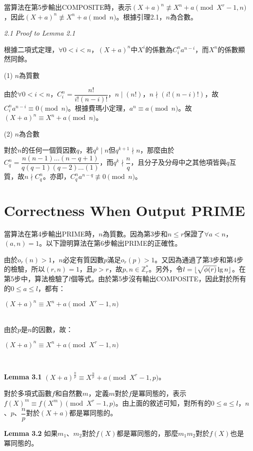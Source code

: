 \documentclass{article}
\DeclarePairedDelimiter\floor{\lfloor}{\rfloor}
\newcommand{\nequiv}{\not\equiv}
\begin{document}
    當算法在第5步輸出COMPOSITE時，表示$(X+a)^n\nequiv X^n+a \pmod{X^r-1, n}$，因此$(X+a)^n\nequiv X^n+a \pmod{n}$。根據引理2.1，$n$為合數。

\noindent\textit{2.1 Proof to Lemma 2.1} 

    根據二項式定理，$\forall 0<i<n$，$(X+a)^n$中$X^i$的係數為$C^n_ia^{n-i}$，而$X^n$的係數顯然同餘。

    \noindent (1) $n$為質數
    
        由於$\forall 0<i<n$，$C^n_i=\dfrac{n!}{i!(n-i)!}$，$n\mid(n!)$，$n\nmid(i!(n-i)!)$，故$C^n_ia^{n-i}\equiv 0\pmod{n}$。根據費瑪小定理，$a^n\equiv a\pmod{n}$。故$(X+a)^n\equiv X^n+a \pmod{n}$。

    \noindent (2) $n$為合數

        對於$n$的任何一個質因數$q$，若$q^k\mid n$但$q^{k+1}\nmid n$，那麼由於$C^n_q=\dfrac{n(n-1)...(n-q+1)}{q(q-1)(q-2)...(1)}$，而$q^k\nmid\dfrac{n}{q}$，且分子及分母中之其他項皆與$q$互質，故$n\nmid C^n_q$。亦即，$C^n_qa^{n-q}\not\equiv 0\pmod{n}$。

\section{Correctness When Output PRIME}

    當算法在第4步輸出PRIME時，$n$為質數。因為第3步和$n\leq r$保證了$\forall a<n$，$(a,n)=1$。以下證明算法在第6步輸出PRIME的正確性。

    由於$o_r(n)>1$，$n$必定有質因數$p$滿足$o_r(p)>1$。又因為通過了第3步和第4步的檢驗，所以$(r,n)=1$，且$p>r$，故$p,n\in \mathbb{Z}_r^*$。另外，令$l=\floor{\sqrt{\phi(r)}\lg n}$。在第5步中，算法檢驗了$l$個等式。由於第5步沒有輸出COMPOSITE，因此對於所有的$0\leq a\leq l$，都有：\\
    \centerline{$(X+a)^n\equiv X^n+a\pmod{X^r-1, n}$}\\
由於$p$是$n$的因數，故：\\
    \centerline{$(X+a)^n\equiv X^n+a\pmod{X^r-1, n}$}\\

\begin{mdframed}
\noindent\textbf{Lemma 3.1} $(X+a)^{\frac{n}{p}}\equiv X^{\frac{n}{p}}+a\pmod{X^r-1, p}$。
\end{mdframed}

    對於多項式函數$f$和自然數$m$，定義$m$對於$f$是冪同態的，表示$f(X)^m\equiv f(X^m)\pmod{X^r-1, p}$。由上面的敘述可知，對所有的$0\leq a\leq l$，$n$、$p$、$\dfrac{n}{p}$對於$(X+a)$都是冪同態的。

\begin{mdframed}
\noindent\textbf{Lemma 3.2} 如果$m_1$、$m_2$對於$f(X)$都是冪同態的，那麼$m_1m_2$對於$f(X)$也是冪同態的。
\end{mdframed}
\end{document}
